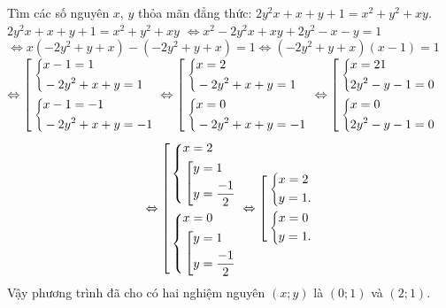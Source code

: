 \begin{bt}%
	Tìm các số nguyên $x$, $y$ thỏa mãn đẳng thức: $2y^2x + x + y + 1 = x^2 + y^2 + xy$. 
	\loigiai
	{
		$2y^2x + x + y + 1 = x^2 + y^2 + xy$ $\Leftrightarrow x^2-2y^2x+xy+2y^2-x-y=1$\\
		$\Leftrightarrow x\left(-2y^2+y+x\right)-\left(-2y^2+y+x\right)=1 \Leftrightarrow (-2y^2+y+x)(x-1)=1$\\
		$\Leftrightarrow \hoac{&\heva{&x-1=1\\&-2y^2+x+y=1}\\&\heva{&x-1=-1\\&-2y^2+x+y=-1}}$ $\Leftrightarrow \hoac{&\heva{&x=2\\&-2y^2+x+y=1}\\&\heva{&x=0\\&-2y^2+x+y=-1}}$ $\Leftrightarrow \hoac{&\heva{&x=21\\&2y^2-y-1=0}\\&\heva{&x=0\\&2y^2-y-1=0}}$ 
		$$\Leftrightarrow \hoac{&\heva{&x=2\\&\hoac{&y=1\\&y=\dfrac{-1}{2}}}\\&\heva{&x=0\\&\hoac{&y=1\\&y=\dfrac{-1}{2}}}}
		\Leftrightarrow \hoac{&\heva{&x=2\\&y=1.}\\&\heva{&x=0\\&y=1.}}$$
		Vậy phương trình đã cho có hai nghiệm nguyên $(x; y)$ là $(0; 1)$ và $(2; 1)$.
	}
\end{bt}

